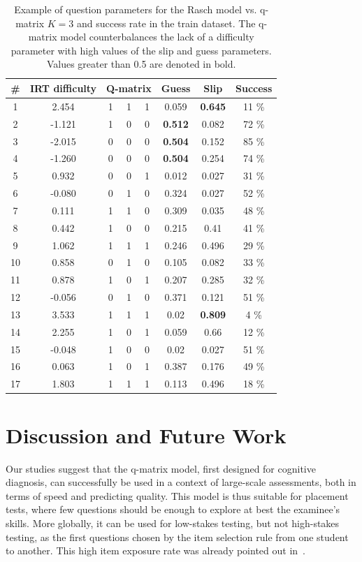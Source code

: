 \documentclass{edm_template}
\begin{document}
\begin{table}
\small\centering\begin{tabular}{c|c|ccccc|c}
\# & IRT difficulty & 	\multicolumn{3}{c}{Q-matrix} & Guess & Slip & Success\\
\hline
1 & 2.454 & 	1 & 1 & 1 & 0.059 & \textbf{0.645} & 11 \% \\
2 & -1.121 & 	1 & 0 & 0 & \textbf{0.512} & 0.082 & 72 \% \\
3 & -2.015 & 	0 & 0 & 0 & \textbf{0.504} & 0.152 & 85 \% \\
4 & -1.260 & 	0 & 0 & 0 & \textbf{0.504} & 0.254 & 74 \% \\
5 & 0.932 & 	0 & 0 & 1 & 0.012 & 0.027 & 31 \% \\
6 & -0.080 & 	0 & 1 & 0 & 0.324 & 0.027 & 52 \% \\
7 & 0.111 & 	1 & 1 & 0 & 0.309 & 0.035 & 48 \% \\
8 & 0.442 & 	1 & 0 & 0 & 0.215 & 0.41 & 41 \% \\
9 & 1.062 & 	1 & 1 & 1 & 0.246 & 0.496 & 29 \% \\
10 & 0.858 & 	0 & 1 & 0 & 0.105 & 0.082 & 33 \% \\
11 & 0.878 & 	1 & 0 & 1 & 0.207 & 0.285 & 32 \% \\
12 & -0.056 & 	0 & 1 & 0 & 0.371 & 0.121 & 51 \% \\
13 & 3.533 & 	1 & 1 & 1 & 0.02 & \textbf{0.809} & 4 \% \\
14 & 2.255 & 	1 & 0 & 1 & 0.059 & 0.66 & 12 \% \\
15 & -0.048 & 	1 & 0 & 0 & 0.02 & 0.027 & 51 \% \\
16 & 0.063 & 	1 & 0 & 1 & 0.387 & 0.176 & 49 \% \\
17 & 1.803 & 	1 & 1 & 1 & 0.113 & 0.496 & 18 \%
\end{tabular}
\caption{Example of question parameters for the Rasch model vs. q-matrix $K = 3$ and success rate in the train dataset. The q-matrix model counterbalances the lack of a difficulty parameter with high values of the slip and guess parameters. Values greater than 0.5 are denoted in bold.}
\label{tab:example}
\end{table}

\section{Discussion and Future Work}

Our studies suggest that the q-matrix model, first designed for cognitive diagnosis, can successfully be used in a context of large-scale assessments, both in terms of speed and predicting quality. This model is thus suitable for placement tests, where few questions should be enough to explore at best the examinee's skills. More globally, it can be used for low-stakes testing, but not high-stakes testing, as the first questions chosen by the item selection rule from one student to another. This high item exposure rate was already pointed out in~\cite{Cheng2009}.
\end{document}
